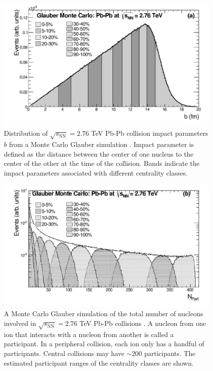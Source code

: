 \begin{figure}[hbt]
\includegraphics[width=36pc]{Figures/BorrowedFigures/GlauberImpactParameter.pdf}
\caption[Monte Carlo Glauber impact parameter simulation]{Distribution of $\sqrt{s_\mathrm{NN}} = 2.76$ TeV Pb-Pb collision impact parameters $b$ from a Monte Carlo Glauber simulation \cite{Abelev:2013xaa}.
Impact parameter is defined as the distance between the center of one nucleus to the center of the other at the time of the collision.
Bands indicate the impact parameters associated with different centrality classes.
}
\label{fig:GlauberImpactParameter}
\end{figure}
\begin{figure}[hbt]
\includegraphics[width=36pc]{Figures/BorrowedFigures/GlauberCentrality.pdf}
\caption[Monte Carlo Glauber number of participants simulation]{A Monte Carlo Glauber simulation of the total number of nucleons involved in $\sqrt{s_\mathrm{NN}} = 2.76$ TeV Pb-Pb collisions \cite{Abelev:2013xaa}.
A nucleon from one ion that interacts with a nucleon from another is called a participant.
In a peripheral collision, each ion only has a handful of participants.
Central collisions may have $\sim 200$ participants.
The estimated participant ranges of the centrality classes are shown.
}
\label{fig:GlauberCentrality}
\end{figure}
